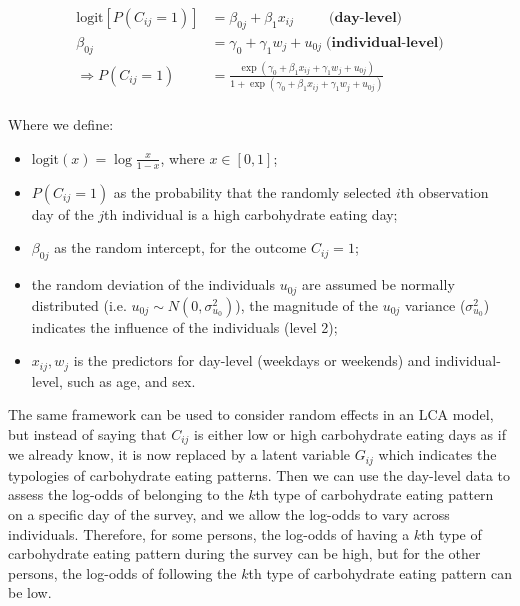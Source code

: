 \begin{equation}
\begin{aligned}
\text{logit}[P(C_{ij} = 1)] & = \beta_{0j} + \beta_{1}x_{ij} \;\;\;\;\;\;\;\;\; \textbf{(day-level)}  \\
\beta_{0j} & = \gamma_0 + \gamma_1 w_j + u_{0j} \; \textbf{(individual-level)} \\ 
\Rightarrow P(C_{ij} = 1) & = \frac{\exp{(\gamma_0 + \beta_{1}x_{ij} + \gamma_1 w_j + u_{0j})}}{1 + \exp{(\gamma_0 + \beta_{1}x_{ij} + \gamma_1 w_j + u_{0j})}} \\
\end{aligned}
\label{randomLCA}
\end{equation}
\vspace{-0.3cm}

Where we define: 

\begin{itemize}
	\item $\text{logit}{(x)} = \log{\frac{x}{1-x}}$, where $x \in [0,1]$;
	\item $P(C_{ij} = 1)$ as the probability that the randomly selected $i$th observation day of the $j$th individual is a high carbohydrate eating day;
	\item $\beta_{0j}$ as the random intercept, for the outcome $C_{ij} = 1$; 
	\item the random deviation of the individuals $u_{0j}$ are assumed be normally distributed (i.e. $u_{0j} \sim N(0, \sigma_{u_0}^2)$), the magnitude of the $u_{0j}$ variance ($\sigma_{u_0}^2$) indicates the influence of the individuals (level 2);
	\item $x_{ij}, w_j$ is the predictors for day-level (weekdays or weekends) and individual-level, such as age, and sex.
\end{itemize}



The same framework can be used to consider random effects in an LCA model, but instead of saying that $C_{ij}$ is either low or high carbohydrate eating days as if we already know, it is now replaced by a latent variable $G_{ij}$ which indicates the typologies of carbohydrate eating patterns. Then we can use the day-level data to assess the log-odds of belonging to the $k$th type of carbohydrate eating pattern on a specific day of the survey, and we allow the log-odds to vary across individuals. Therefore, for some persons, the log-odds of having a $k$th type of carbohydrate eating pattern during the survey can be high, but for the other persons, the log-odds of following the $k$th type of carbohydrate eating pattern can be low. 


